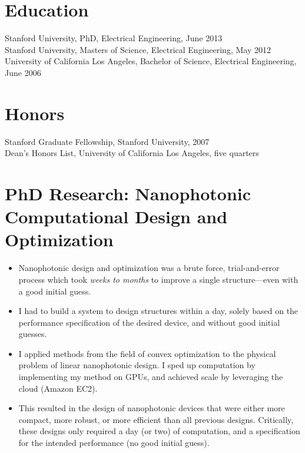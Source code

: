 \documentclass{res}
\begin{document}
 

\address{\texttt{jesselu@stanford.edu} \\ 66 Newell Rd. Apt. O \\ East Palo Alto, CA \\ (408) 568-9356}
                                  
\begin{resume}

\section{Education}          
    Stanford University, PhD, Electrical Engineering, June 2013 \\
    Stanford University, Masters of Science, Electrical Engineering, May 2012 \\
    University of California Los Angeles, Bachelor of Science, Electrical Engineering, June 2006

\section{Honors}
    Stanford Graduate Fellowship, Stanford University, 2007 \\
    Dean's Honors List, University of California Los Angeles, five quarters

\section{PhD Research: Nanophotonic Computational Design and Optimization}
\begin{itemize}
\item Nanophotonic design and optimization was 
    a brute force, trial-and-error process
    which took \emph{weeks to months} to improve a single structure---even with 
    a good initial guess.
\item I had to build a system to design structures within a day,
    solely based on the performance specification of the desired device,
    and without good initial guesses.
\item I applied methods from the field of convex optimization 
    to the physical problem of linear nanophotonic design. 
    I sped up computation by implementing my method on GPUs,
    and achieved scale by leveraging the cloud (Amazon EC2).
\item This resulted in the design 
    of nanophotonic devices that were either
    more compact, more robust, or more efficient 
    than all previous designs.
    Critically, these designs only required a day (or two) of computation,
    and a specification for the intended performance (no good initial guess).
    \end{itemize}


\end{resume}
\end{document}
